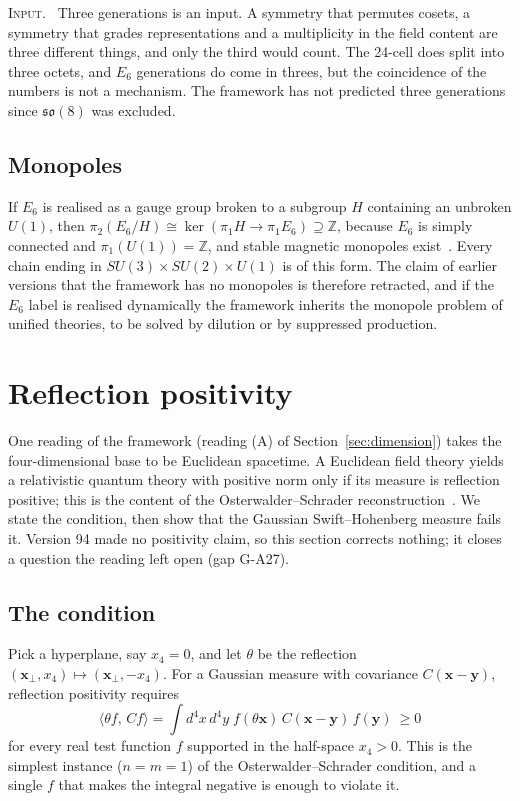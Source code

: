 \documentclass[a4paper,11pt]{article}
\makeatletter
\numberwithin{equation}{section}
\theoremstyle{jsplain}
\theoremstyle{jsrem}
\newcommand{\lbl}[1]{\textcolor{lbl@#1}{\textsc{#1}}.\ }
\makeatother
\begin{document}
\lbl{Input} Three generations is an input. A symmetry that permutes cosets, a symmetry that grades representations and a multiplicity in the field content are three different things, and only the third would count. The 24-cell does split into three octets, and $E_6$ generations do come in threes, but the coincidence of the numbers is not a mechanism. The framework has not predicted three generations since $\mathfrak{so}(8)$ was excluded.

\subsection{Monopoles}

If $E_6$ is realised as a gauge group broken to a subgroup $H$ containing an unbroken $U(1)$, then $\pi_2(E_6/H)\cong\ker(\pi_1H\to\pi_1E_6)\supseteq\mathbb{Z}$, because $E_6$ is simply connected and $\pi_1(U(1))=\mathbb{Z}$, and stable magnetic monopoles exist~\cite{ref33}. Every chain ending in $SU(3)\times SU(2)\times U(1)$ is of this form. The claim of earlier versions that the framework has no monopoles is therefore retracted, and if the $E_6$ label is realised dynamically the framework inherits the monopole problem of unified theories, to be solved by dilution or by suppressed production.

\section{Reflection positivity}\label{sec:rp}

One reading of the framework (reading (A) of Section~\ref{sec:dimension}) takes the four-dimensional base to be Euclidean spacetime. A Euclidean field theory yields a relativistic quantum theory with positive norm only if its measure is reflection positive; this is the content of the Osterwalder--Schrader reconstruction~\cite{ref48,ref49}. We state the condition, then show that the Gaussian Swift--Hohenberg measure fails it. Version 94 made no positivity claim, so this section corrects nothing; it closes a question the reading left open (gap G-A27).

\subsection{The condition}

Pick a hyperplane, say $x_4=0$, and let $\theta$ be the reflection $(\mathbf{x}_\perp,x_4)\mapsto(\mathbf{x}_\perp,-x_4)$. For a Gaussian measure with covariance $C(\mathbf{x}-\mathbf{y})$, reflection positivity requires
\begin{equation}\label{eq:rpcond}
\langle\theta f,\,Cf\rangle=\int d^4x\,d^4y\;f(\theta\mathbf{x})\,C(\mathbf{x}-\mathbf{y})\,f(\mathbf{y})\ \ge0
\end{equation}
for every real test function $f$ supported in the half-space $x_4>0$. This is the simplest instance ($n=m=1$) of the Osterwalder--Schrader condition, and a single $f$ that makes the integral negative is enough to violate it.
\end{document}
